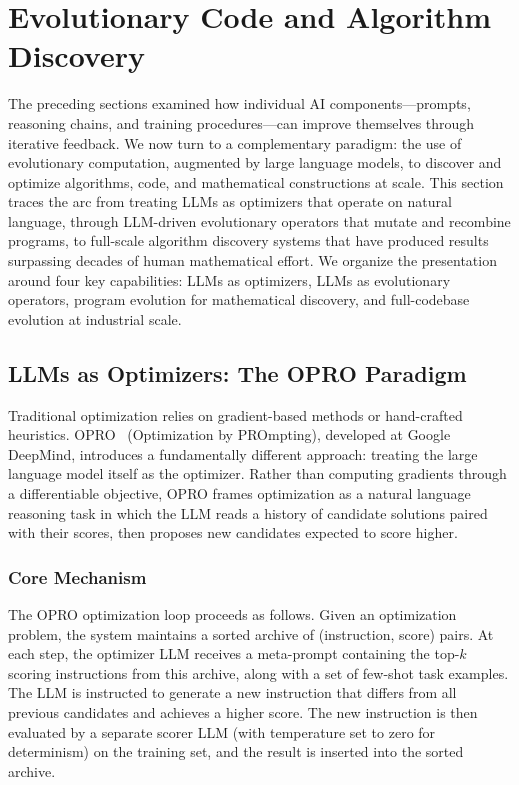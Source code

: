 \section{Evolutionary Code and Algorithm Discovery}
\label{sec:evolutionary-code}

The preceding sections examined how individual AI components---prompts, reasoning chains, and training procedures---can improve themselves through iterative feedback. We now turn to a complementary paradigm: the use of evolutionary computation, augmented by large language models, to discover and optimize algorithms, code, and mathematical constructions at scale. This section traces the arc from treating LLMs as optimizers that operate on natural language, through LLM-driven evolutionary operators that mutate and recombine programs, to full-scale algorithm discovery systems that have produced results surpassing decades of human mathematical effort. We organize the presentation around four key capabilities: LLMs as optimizers, LLMs as evolutionary operators, program evolution for mathematical discovery, and full-codebase evolution at industrial scale.

\subsection{LLMs as Optimizers: The OPRO Paradigm}
\label{sec:opro}

Traditional optimization relies on gradient-based methods or hand-crafted heuristics. OPRO~\citep{yang2023large} (Optimization by PROmpting), developed at Google DeepMind, introduces a fundamentally different approach: treating the large language model itself as the optimizer. Rather than computing gradients through a differentiable objective, OPRO frames optimization as a natural language reasoning task in which the LLM reads a history of candidate solutions paired with their scores, then proposes new candidates expected to score higher.

\subsubsection{Core Mechanism}

The OPRO optimization loop proceeds as follows. Given an optimization problem, the system maintains a sorted archive of (instruction, score) pairs. At each step, the optimizer LLM receives a meta-prompt containing the top-$k$ scoring instructions from this archive, along with a set of few-shot task examples. The LLM is instructed to generate a new instruction that differs from all previous candidates and achieves a higher score. The new instruction is then evaluated by a separate scorer LLM (with temperature set to zero for determinism) on the training set, and the result is inserted into the sorted archive.

